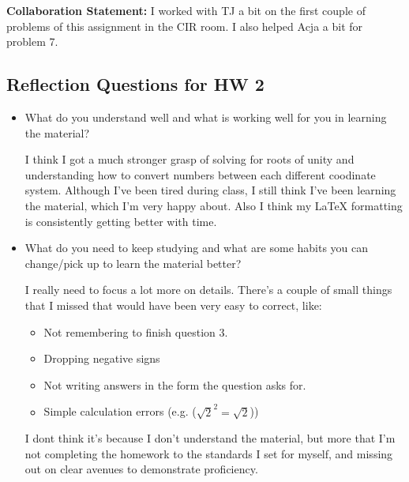 \begin{reflection}
	\textbf{Collaboration Statement: } I worked with TJ a bit on the first couple of problems of this assignment in the CIR room. I also helped Acja a bit for problem 7. 
\end{reflection}


\subsection*{Reflection Questions for HW 2}
    \begin{itemize}
        \item What do you understand well and what is working well for you in learning the material?

        \begin{reflection}
			I think I got a much stronger grasp of solving for roots of unity and understanding how to convert numbers between each different coodinate system. Although I've been tired during class, I still think I've been learning the material, which I'm very happy about. Also I think my LaTeX formatting is consistently getting better with time.
		\end{reflection}

        \item What do you need to keep studying and what are some habits you can change/pick up to learn the material better?

        \begin{reflection}
			I really need to focus a lot more on details. There's a couple of small things that I missed that would have been very easy to correct, like:
			\begin{itemize}[itemsep=0pt, parsep=0pt]
				\item Not remembering to finish question 3. 
				\item Dropping negative signs
				\item Not writing answers in the form the question asks for. 
				\item Simple calculation errors (e.g. ($\sqrt{2}^2 = \sqrt{2}$))
			\end{itemize}
			I dont think it's because I don't understand the material, but more that I'm not completing the homework to the standards I set for myself, and missing out on clear avenues to demonstrate proficiency. 
		\end{reflection}
    \end{itemize}
